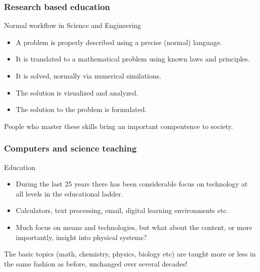 \documentclass{beamer}
\begin{document}
\begin{frame}
\frametitle{Research based education}

\begin{block}{Normal workflow in Science and Engineering }

\begin{itemize}
\item A problem is properly described using a precise (normal) language.

\item It is translated to a mathematical problem using known laws and  principles.

\item It is solved, normally via numerical similations.

\item The solution is visualized and analyzed.

\item The solution to the problem is formulated.
\end{itemize}

\noindent
People who master these skills bring an important compentence to society. 
\end{block}
\end{frame}

\begin{frame}
\frametitle{Computers and science teaching}

\begin{block}{Education }

\begin{itemize}
\item During the  last 25 years  there has been considerable focus on  technology at all levels in the educational ladder.

\item Calculators, text processing, email, digital learning environments etc.

\item Much focus on means and technologies, but what about the content, or more importantly, insight into  physical systems?
\end{itemize}

\noindent
The basic topics (math, chemistry, physics, biology etc) are taught more or less in the same fashion as before, unchanged over several decades! 
\end{block}
\end{frame}
\end{document}
